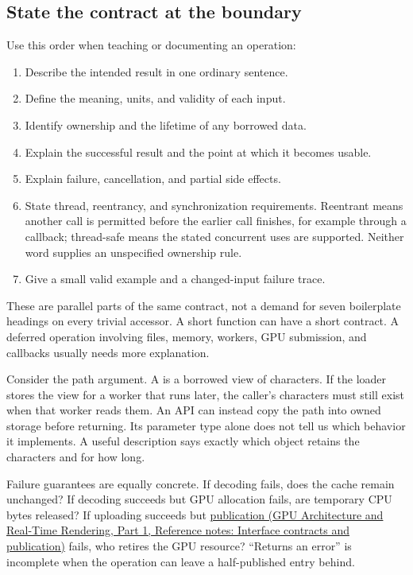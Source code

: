 \subsection{State the contract at the boundary}\label{05-engine-i-ch008-state-the-contract-at-the-boundary}

\hypertarget{05-engine-i-ch008-state-the-contract-at-the-boundary}{}

Use this order when teaching or documenting an operation:

\begin{enumerate}
\def\labelenumi{\arabic{enumi}.}
\tightlist
\item
  Describe the intended result in one ordinary sentence.
\item
  Define the meaning, units, and validity of each input.
\item
  Identify ownership and the lifetime of any borrowed data.
\item
  Explain the successful result and the point at which it becomes usable.
\item
  Explain failure, cancellation, and partial side effects.
\item
  State thread, reentrancy, and synchronization requirements. Reentrant means another call is permitted before the earlier call finishes, for example through a callback; thread-safe means the stated concurrent uses are supported. Neither word supplies an unspecified ownership rule.
\item
  Give a small valid example and a changed-input failure trace.
\end{enumerate}

These are parallel parts of the same contract, not a demand for seven boilerplate headings on every trivial accessor. A short function can have a short contract. A deferred operation involving files, memory, workers, GPU submission, and callbacks usually needs more explanation.

Consider the path argument. A  is a borrowed view of characters. If the loader stores the view for a worker that runs later, the caller's characters must still exist when that worker reads them. An API can instead copy the path into owned storage before returning. Its parameter type alone does not tell us which behavior it implements. A useful description says exactly which object retains the characters and for how long.

Failure guarantees are equally concrete. If decoding fails, does the cache remain unchanged? If decoding succeeds but GPU allocation fails, are temporary CPU bytes released? If uploading succeeds but \href{../06-GPU-Architecture-and-Real-Time-Rendering-P01/main.pdf\#nameddest=appendix-fdae7ff0a23f}{publication (GPU Architecture and Real-Time Rendering, Part 1, Reference notes: Interface contracts and publication)} fails, who retires the GPU resource? ``Returns an error'' is incomplete when the operation can leave a half-published entry behind.


